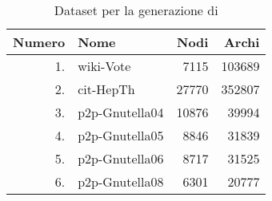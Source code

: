 \begin{table}
    \caption{Dataset per la generazione di \muln}
    \label{tab:multilayer}
    \centering
    \begin{tabular}{rlrr}
        \toprule
            Numero & Nome & Nodi & Archi \\
        \midrule
        1. & wiki-Vote & \num{7115} & \num{103689} \\
        2. & cit-HepTh & \num{27770} & \num{352807} \\
        3. & p2p-Gnutella04 & \num{10876} &  \num{39994} \\ 
        4. & p2p-Gnutella05  & \num{8846} & \num{31839} \\ 
        5. & p2p-Gnutella06  & \num{8717} & \num{31525} \\ 
        6. & p2p-Gnutella08 & \num{6301} & \num{20777} \\
        \bottomrule
    \end{tabular}
%         
\end{table}